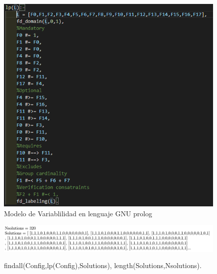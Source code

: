 \documentclass[10pt,a4paper,openany]{book}
\begin{document}
\begin{figure}[h]
	\centering
	\includegraphics[width=1\textwidth]{gnu}
	\caption{Modelo de Variablilidad en lenguaje GNU prolog}
	\label{fig:gnu}
\end{figure} 

\begin{figure}[h]
	\centering
	\caption{findall(Config,lp(Config),Solutions), length(Solutions,Nsolutions).}
	\includegraphics[width=1\textwidth]{gnu1}
	\label{fig:gnu1}
\end{figure}
\end{document}
